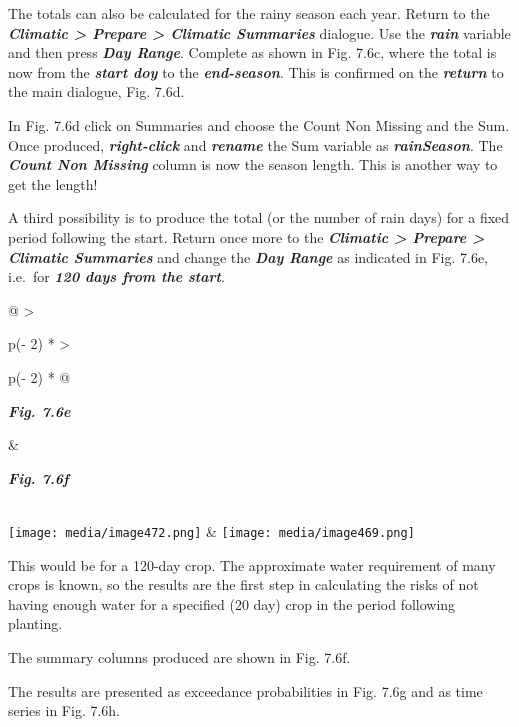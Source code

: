 \documentclass[
  letterpaper,
  DIV=11,
  numbers=noendperiod]{scrreprt}
\begin{document}
The totals can also be calculated for the rainy season each year. Return
to the \textbf{\emph{Climatic \textgreater{} Prepare \textgreater{}
Climatic Summaries}} dialogue. Use the \textbf{\emph{rain}} variable and
then press \textbf{\emph{Day Range}}. Complete as shown in Fig. 7.6c,
where the total is now from the \textbf{\emph{start doy}} to the
\textbf{\emph{end-season}}. This is confirmed on the
\textbf{\emph{return}} to the main dialogue, Fig. 7.6d.

In Fig. 7.6d click on Summaries and choose the Count Non Missing and the
Sum. Once produced, \textbf{\emph{right-click}} and
\textbf{\emph{rename}} the Sum variable as \textbf{\emph{rainSeason}}.
The \textbf{\emph{Count Non Missing}} column is now the season length.
This is another way to get the length!

A third possibility is to produce the total (or the number of rain days)
for a fixed period following the start. Return once more to the
\textbf{\emph{Climatic \textgreater{} Prepare \textgreater{} Climatic
Summaries}} and change the \textbf{\emph{Day Range}} as indicated in
Fig. 7.6e, i.e.~for \textbf{\emph{120 days from the start}}.

\begin{longtable}[]{@{}
  >{\raggedright\arraybackslash}p{(\columnwidth - 2\tabcolsep) * }
  >{\raggedright\arraybackslash}p{(\columnwidth - 2\tabcolsep) * }@{}}
\toprule\noalign{}
\begin{minipage}[b]{\linewidth}\raggedright
\textbf{\emph{Fig. 7.6e}}
\end{minipage} & \begin{minipage}[b]{\linewidth}\raggedright
\textbf{\emph{Fig. 7.6f}}
\end{minipage} \\
\midrule\noalign{}
\endhead
\bottomrule\noalign{}
\endlastfoot
\texttt{[image: media/image472.png]} &
\texttt{[image: media/image469.png]} \\
\end{longtable}

This would be for a 120-day crop. The approximate water requirement of
many crops is known, so the results are the first step in calculating
the risks of not having enough water for a specified (20 day) crop in
the period following planting.

The summary columns produced are shown in Fig. 7.6f.

The results are presented as exceedance probabilities in Fig. 7.6g and
as time series in Fig. 7.6h.
\end{document}
